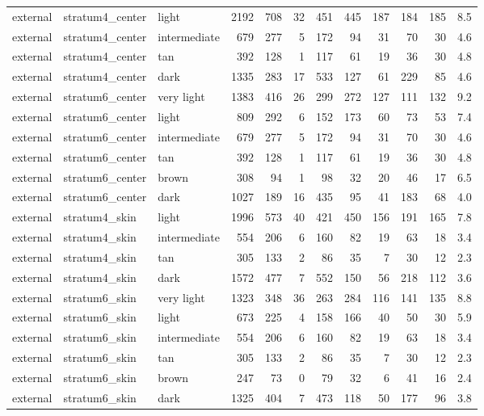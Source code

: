 \begin{tabular}{lllrrrrrrrrr}
external & stratum4\_center & light & 2192 & 708 & 32 & 451 & 445 & 187 & 184 & 185 & 8.5 \\
external & stratum4\_center & intermediate & 679 & 277 & 5 & 172 & 94 & 31 & 70 & 30 & 4.6 \\
external & stratum4\_center & tan & 392 & 128 & 1 & 117 & 61 & 19 & 36 & 30 & 4.8 \\
external & stratum4\_center & dark & 1335 & 283 & 17 & 533 & 127 & 61 & 229 & 85 & 4.6 \\
external & stratum6\_center & very light & 1383 & 416 & 26 & 299 & 272 & 127 & 111 & 132 & 9.2 \\
external & stratum6\_center & light & 809 & 292 & 6 & 152 & 173 & 60 & 73 & 53 & 7.4 \\
external & stratum6\_center & intermediate & 679 & 277 & 5 & 172 & 94 & 31 & 70 & 30 & 4.6 \\
external & stratum6\_center & tan & 392 & 128 & 1 & 117 & 61 & 19 & 36 & 30 & 4.8 \\
external & stratum6\_center & brown & 308 & 94 & 1 & 98 & 32 & 20 & 46 & 17 & 6.5 \\
external & stratum6\_center & dark & 1027 & 189 & 16 & 435 & 95 & 41 & 183 & 68 & 4.0 \\
external & stratum4\_skin & light & 1996 & 573 & 40 & 421 & 450 & 156 & 191 & 165 & 7.8 \\
external & stratum4\_skin & intermediate & 554 & 206 & 6 & 160 & 82 & 19 & 63 & 18 & 3.4 \\
external & stratum4\_skin & tan & 305 & 133 & 2 & 86 & 35 & 7 & 30 & 12 & 2.3 \\
external & stratum4\_skin & dark & 1572 & 477 & 7 & 552 & 150 & 56 & 218 & 112 & 3.6 \\
external & stratum6\_skin & very light & 1323 & 348 & 36 & 263 & 284 & 116 & 141 & 135 & 8.8 \\
external & stratum6\_skin & light & 673 & 225 & 4 & 158 & 166 & 40 & 50 & 30 & 5.9 \\
external & stratum6\_skin & intermediate & 554 & 206 & 6 & 160 & 82 & 19 & 63 & 18 & 3.4 \\
external & stratum6\_skin & tan & 305 & 133 & 2 & 86 & 35 & 7 & 30 & 12 & 2.3 \\
external & stratum6\_skin & brown & 247 & 73 & 0 & 79 & 32 & 6 & 41 & 16 & 2.4 \\
external & stratum6\_skin & dark & 1325 & 404 & 7 & 473 & 118 & 50 & 177 & 96 & 3.8 \\
\bottomrule
\end{tabular}
